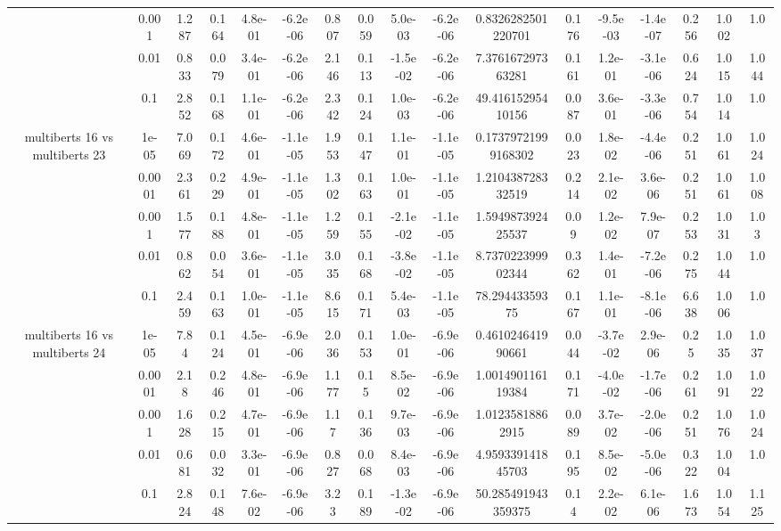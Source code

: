 \begin{tabular}{|c|c|c|c|c|c|c|c|c|c|c|c|c|c|c|c|c|}
 & 0.001 & 1.287 & 0.164 & 4.8e-01 & -6.2e-06 & 0.807 & 0.059 & 5.0e-03 & -6.2e-06 & 0.8326282501220701 & 0.176 & -9.5e-03 & -1.4e-07 & 0.256 & 1.002 & 1.0 \\
 & 0.01 & 0.833 & 0.079 & 3.4e-01 & -6.2e-06 & 2.146 & 0.113 & -1.5e-02 & -6.2e-06 & 7.376167297363281 & 0.161 & 1.2e-01 & -3.1e-06 & 0.624 & 1.015 & 1.044 \\
 & 0.1 & 2.852 & 0.168 & 1.1e-01 & -6.2e-06 & 2.342 & 0.124 & 1.0e-03 & -6.2e-06 & 49.41615295410156 & 0.087 & 3.6e-01 & -3.3e-06 & 0.754 & 1.014 & 1.0 \\
\hline
\multirow{5}{*}{multiberts 16 vs multiberts 23} & 1e-05 & 7.069 & 0.172 & 4.6e-01 & -1.1e-05 & 1.953 & 0.147 & 1.1e-01 & -1.1e-05 & 0.17379721999168302 & 0.023 & 1.8e-02 & -4.4e-06 & 0.251 & 1.061 & 1.024 \\
 & 0.0001 & 2.361 & 0.229 & 4.9e-01 & -1.1e-05 & 1.302 & 0.163 & 1.0e-01 & -1.1e-05 & 1.210438728332519 & 0.214 & 2.1e-02 & 3.6e-06 & 0.251 & 1.061 & 1.008 \\
 & 0.001 & 1.577 & 0.188 & 4.8e-01 & -1.1e-05 & 1.259 & 0.155 & -2.1e-02 & -1.1e-05 & 1.594987392425537 & 0.09 & 1.2e-02 & 7.9e-07 & 0.253 & 1.031 & 1.03 \\
 & 0.01 & 0.862 & 0.054 & 3.6e-01 & -1.1e-05 & 3.035 & 0.168 & -3.8e-02 & -1.1e-05 & 8.737022399902344 & 0.362 & 1.4e-01 & -7.2e-06 & 0.275 & 1.044 & 1.0 \\
 & 0.1 & 2.459 & 0.163 & 1.0e-01 & -1.1e-05 & 8.615 & 0.171 & 5.4e-03 & -1.1e-05 & 78.29443359375 & 0.167 & 1.1e-01 & -8.1e-06 & 6.638 & 1.006 & 1.0 \\
\hline
\multirow{5}{*}{multiberts 16 vs multiberts 24} & 1e-05 & 7.84 & 0.124 & 4.5e-01 & -6.9e-06 & 2.036 & 0.153 & 1.0e-01 & -6.9e-06 & 0.461024641990661 & 0.044 & -3.7e-02 & 2.9e-06 & 0.25 & 1.035 & 1.037 \\
 & 0.0001 & 2.18 & 0.246 & 4.8e-01 & -6.9e-06 & 1.177 & 0.15 & 8.5e-02 & -6.9e-06 & 1.001490116119384 & 0.171 & -4.0e-02 & -1.7e-06 & 0.261 & 1.091 & 1.022 \\
 & 0.001 & 1.628 & 0.215 & 4.7e-01 & -6.9e-06 & 1.17 & 0.136 & 9.7e-03 & -6.9e-06 & 1.01235818862915 & 0.089 & 3.7e-02 & -2.0e-06 & 0.251 & 1.076 & 1.024 \\
 & 0.01 & 0.681 & 0.032 & 3.3e-01 & -6.9e-06 & 0.827 & 0.068 & 8.4e-03 & -6.9e-06 & 4.959339141845703 & 0.195 & 8.5e-02 & -5.0e-06 & 0.322 & 1.004 & 1.0 \\
 & 0.1 & 2.824 & 0.148 & 7.6e-02 & -6.9e-06 & 3.23 & 0.189 & -1.3e-02 & -6.9e-06 & 50.285491943359375 & 0.14 & 2.2e-02 & 6.1e-06 & 1.673 & 1.054 & 1.125 \\

\end{tabular}
